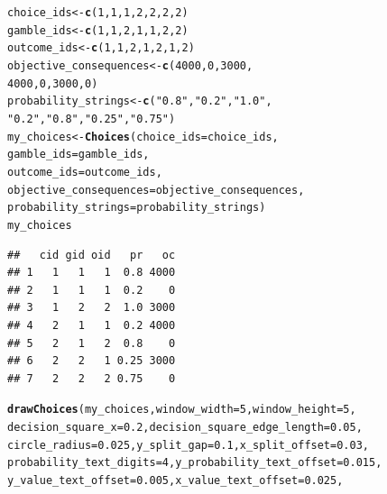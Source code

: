 \documentclass{article}\usepackage[]{graphicx}\usepackage[]{color}
\makeatletter
\newcommand{\hlnum}[1]{\textcolor[rgb]{0.686,0.059,0.569}{#1}}%
\newcommand{\hlstr}[1]{\textcolor[rgb]{0.192,0.494,0.8}{#1}}%
\newcommand{\hlstd}[1]{\textcolor[rgb]{0.345,0.345,0.345}{#1}}%
\newcommand{\hlkwb}[1]{\textcolor[rgb]{0.69,0.353,0.396}{#1}}%
\newcommand{\hlkwc}[1]{\textcolor[rgb]{0.333,0.667,0.333}{#1}}%
\newcommand{\hlkwd}[1]{\textcolor[rgb]{0.737,0.353,0.396}{\textbf{#1}}}%
\newenvironment{kframe}{%
 \def\at@end@of@kframe{}%
 \ifinner\ifhmode%
  \def\at@end@of@kframe{\end{minipage}}%
  \begin{minipage}{\columnwidth}%
 \fi\fi%
 \def\FrameCommand##1{\hskip\@totalleftmargin \hskip-\fboxsep
 \colorbox{shadecolor}{##1}\hskip-\fboxsep
     \hskip-\linewidth \hskip-\@totalleftmargin \hskip\columnwidth}%
 \MakeFramed {\advance\hsize-\width
   \@totalleftmargin\z@ \linewidth\hsize
   \@setminipage}}%
 {\par\unskip\endMakeFramed%
 \at@end@of@kframe}
\newenvironment{knitrout}{}{} %
\makeatother
\begin{document}
\begin{knitrout}
\color{fgcolor}\begin{kframe}
\begin{alltt}
\hlstd{choice_ids} \hlkwb{<-} \hlkwd{c}\hlstd{(}\hlnum{1}\hlstd{,} \hlnum{1}\hlstd{,} \hlnum{1}\hlstd{,} \hlnum{2}\hlstd{,} \hlnum{2}\hlstd{,} \hlnum{2}\hlstd{,} \hlnum{2}\hlstd{)}
\hlstd{gamble_ids} \hlkwb{<-} \hlkwd{c}\hlstd{(}\hlnum{1}\hlstd{,} \hlnum{1}\hlstd{,} \hlnum{2}\hlstd{,} \hlnum{1}\hlstd{,} \hlnum{1}\hlstd{,} \hlnum{2}\hlstd{,} \hlnum{2}\hlstd{)}
\hlstd{outcome_ids} \hlkwb{<-} \hlkwd{c}\hlstd{(}\hlnum{1}\hlstd{,} \hlnum{1}\hlstd{,} \hlnum{2}\hlstd{,} \hlnum{1}\hlstd{,} \hlnum{2}\hlstd{,} \hlnum{1}\hlstd{,} \hlnum{2}\hlstd{)}
\hlstd{objective_consequences} \hlkwb{<-} \hlkwd{c}\hlstd{(}\hlnum{4000}\hlstd{,} \hlnum{0}\hlstd{,} \hlnum{3000}\hlstd{,}
        \hlnum{4000}\hlstd{,} \hlnum{0}\hlstd{,} \hlnum{3000}\hlstd{,} \hlnum{0}\hlstd{)}
\hlstd{probability_strings} \hlkwb{<-} \hlkwd{c}\hlstd{(}\hlstr{"0.8"}\hlstd{,} \hlstr{"0.2"}\hlstd{,} \hlstr{"1.0"}\hlstd{,}
        \hlstr{"0.2"}\hlstd{,} \hlstr{"0.8"}\hlstd{,} \hlstr{"0.25"}\hlstd{,} \hlstr{"0.75"}\hlstd{)}
\hlstd{my_choices} \hlkwb{<-} \hlkwd{Choices}\hlstd{(}\hlkwc{choice_ids}\hlstd{=choice_ids,}
        \hlkwc{gamble_ids}\hlstd{=gamble_ids,}
        \hlkwc{outcome_ids}\hlstd{=outcome_ids,}
        \hlkwc{objective_consequences}\hlstd{=objective_consequences,}
        \hlkwc{probability_strings}\hlstd{=probability_strings)}
\hlstd{my_choices}
\end{alltt}
\begin{verbatim}
##   cid gid oid   pr   oc
## 1   1   1   1  0.8 4000
## 2   1   1   1  0.2    0
## 3   1   2   2  1.0 3000
## 4   2   1   1  0.2 4000
## 5   2   1   2  0.8    0
## 6   2   2   1 0.25 3000
## 7   2   2   2 0.75    0
\end{verbatim}
\begin{alltt}
\hlkwd{drawChoices}\hlstd{(my_choices,} \hlkwc{window_width}\hlstd{=}\hlnum{5}\hlstd{,} \hlkwc{window_height}\hlstd{=}\hlnum{5}\hlstd{,}
        \hlkwc{decision_square_x}\hlstd{=}\hlnum{0.2}\hlstd{,} \hlkwc{decision_square_edge_length}\hlstd{=}\hlnum{0.05}\hlstd{,}
        \hlkwc{circle_radius}\hlstd{=}\hlnum{0.025}\hlstd{,} \hlkwc{y_split_gap}\hlstd{=}\hlnum{0.1}\hlstd{,} \hlkwc{x_split_offset}\hlstd{=}\hlnum{0.03}\hlstd{,}
        \hlkwc{probability_text_digits}\hlstd{=}\hlnum{4}\hlstd{,} \hlkwc{y_probability_text_offset}\hlstd{=}\hlnum{0.015}\hlstd{,}
        \hlkwc{y_value_text_offset}\hlstd{=}\hlnum{0.005}\hlstd{,} \hlkwc{x_value_text_offset}\hlstd{=}\hlnum{0.025}\hlstd{,}

\end{alltt}
\end{kframe}
\end{knitrout}
\end{document}
